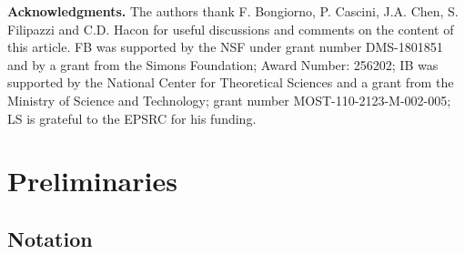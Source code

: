 	\textbf{Acknowledgments.}
	The authors thank F. Bongiorno, P. Cascini, J.A. Chen, S. Filipazzi and C.D. Hacon for useful discussions and comments on the content of this article. 
	FB was supported by the NSF under grant number DMS-1801851 and by a grant from the Simons Foundation; Award Number: 256202; IB was supported by the National Center for Theoretical Sciences and a grant from the Ministry of Science and Technology; grant number MOST-110-2123-M-002-005; LS is grateful to the EPSRC for his funding.
	
	\section{Preliminaries}
	
	\subsection{Notation}\label{notation}
	

